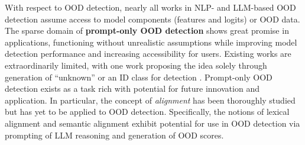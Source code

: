 With respect to OOD detection, nearly all works in NLP- and LLM-based OOD detection assume access to model components (features and logits) or OOD data. The sparse domain of \textbf{prompt-only OOD detection} shows great promise in applications, functioning without unrealistic assumptions while improving model detection performance and increasing accessibility for users. Existing works are extraordinarily limited, with one work proposing the idea solely through generation of ``unknown'' or an ID class for detection \cite{wang2024beyond}. Prompt-only OOD detection exists as a task rich with potential for future innovation and application. In particular, the concept of \textit{alignment} \cite{yousef2020survey,wang2020measurement,bani2025hybrid,zaricna2015word,yang2019simple,chang2021deep,xylogiannopoulos2025power} has been thoroughly studied but has yet to be applied to OOD detection. Specifically, the notions of lexical alignment \cite{el2021xlent,dyer2013simple,srivastava2025measuring} and semantic alignment \cite{el2021xlent,thompson2020cultural} exhibit potential for use in OOD detection via prompting of LLM reasoning and generation of OOD scores.

